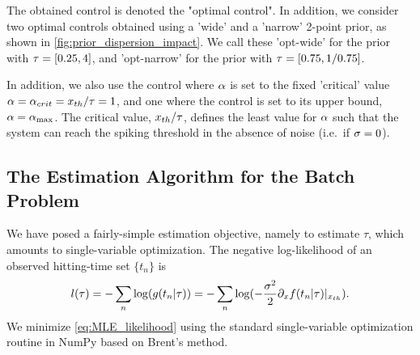 \documentclass{article}
\begin{document}
The obtained control is denoted the "optimal control". In addition, we consider 
two optimal controls obtained using a 'wide' and a 'narrow' 2-point prior, as
shown in \cref{fig:prior_dispersion_impact}. We call these 'opt-wide' for the
prior with ${ \tau } =  [0.25, 4]$, and 'opt-narrow' for the prior with  ${ \tau } =  
[0.75, 1/0.75]$.  

In addition, we also use the control where ${\alpha}$ is set to the fixed 'critical' value 
${\alpha} = {\alpha}_{crit} = { x_{th} }/{ \tau } = 1$, and one where the control is set to its upper
bound, ${\alpha} = { {\alpha}_{\textrm{max}} }$. The critical value, ${ x_{th} }/{ \tau }$, defines the least
value for ${\alpha}$ such that the system can reach the spiking threshold in the
absence of noise (i.e.\ if ${\sigma }=0$).

\subsection{The Estimation Algorithm for the Batch Problem}

We have posed a fairly-simple estimation objective, namely to estimate $\tau$, which
amounts to single-variable optimization. The negative log-likelihood of an
observed hitting-time set $\{t_n\}$ is
\begin{equation}
l({ \tau }) = - \sum_n \log ( g(t_n | { \tau }) ) =  - \sum_n \log ( -\frac{{\sigma }^2}2 {\partial}_x
f(t_n | { \tau }) |_{{ x_{th} }} ).
\label{eq:MLE_likelihood}
\end{equation}
We minimize \cref{eq:MLE_likelihood} using the standard single-variable
optimization routine in NumPy based on Brent's method.

% 
\end{document}
